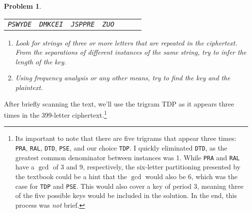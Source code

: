 \documentclass[12pt]{article}
\newtheorem{problem}{Problem}
\theoremstyle{remark}  %
\begin{document}
\begin{problem}
\begin{center}
\begin{tabular}{lllllll}
                \texttt{PSWYDE} & \texttt{DMKCEI} & \texttt{JSPPRE} & \texttt{ZUO} & \texttt{} & \texttt{} & \texttt{} \\
            \end{tabular}
        \end{center}
        \begin{enumerate}[label=(\alph*)]
            \item Look for strings of three or more letters that are repeated in the ciphertext. From the separations of different instances of the same string, try to infer the length of the key.
            \item Using frequency analysis or any other means, try to find the key and the plaintext.
        \end{enumerate}
    \end{problem}
    After briefly scanning the text, we'll use the trigram \textsc{TDP} as it appears three times in the 399-letter ciphertext.\footnote{Its important to note that there are five trigrams that appear three times: \texttt{PRA}, \texttt{RAL}, \texttt{DTD}, \texttt{PSE}, and our choice \texttt{TDP}. I quickly eliminated \texttt{DTD}, as the greatest common denominator between instances was 1. While \texttt{PRA} and \texttt{RAL} have a $\gcd$ of 3 and 9, respectively, the six-letter partitioning presented by the textbook could be a hint that the $\gcd$ would also be 6, which was the case for \texttt{TDP} and \texttt{PSE}. This would also cover a key of period 3, meaning three of the five possible keys would be included in the solution. In the end, this process was \emph{not} brief.}
\end{document}
